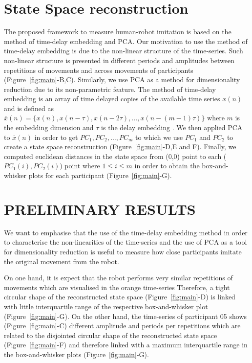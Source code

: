 \documentclass{sig-alternate-05-2015}
\begin{document}
\section{State Space reconstruction}
The proposed framework to measure human-robot imitation
is based on the method of time-delay embedding and PCA.
Our motivation to use the method of time-delay embedding
is due to the non-linear structure of the time-series.
Such non-linear structure is presented in different periods and amplitudes 
between repetitions of movements and across movements of participants (Figure~\ref{fig:main}-B,C).
Similarly, we use PCA as a method for dimensionality reduction due to its non-parametric feature.
The method of time-delay embedding is an array of 
time delayed copies of the available time series $x(n)$ and is defined as  
$ \overline{x}(n) = \{  x(n), x(n-\tau), x(n-2\tau), \dots,x(n-(m-1)\tau)\}$
where $m$ is the embedding dimension and $\tau$ is the delay embedding \cite{Huke2006}.
We then applied PCA to $ \overline{x}(n)$ in order to get $PC_1, PC_2, \dots, PC_m$ 
to which we use $PC_1$ and $PC_2$ 
to create a state space reconstruction (Figure~\ref{fig:main}-D,E and F).
Finally, we computed euclidean distances in the state space 
from (0,0) point to each ($PC_1(i),PC_2(i)$) point where $1 \leq i \leq m$
in order to obtain the box-and-whisker plots for each participant (Figure~\ref{fig:main}-G).




\section{PRELIMINARY RESULTS}



We want to emphasise that the use of the time-delay embedding 
method in order to characterise the non-linearities of the time-series 
and the use of PCA as a tool for dimensionality 
reduction is useful to measure how close participants 
imitate the original movement from the robot.


On one hand, it is expect that the robot performs very similar repetitions of movements 
which are visualised in the orange time-series
Therefore, a tight circular  shape of the reconstructed state space (Figure~\ref{fig:main}-D)
is linked with little interquartile range of the respective box-and-whisker plot  (Figure~\ref{fig:main}-G).
On the other hand, 
the time-series of participant 05 shows (Figure~\ref{fig:main}-C)
 different amplitude and periods per repetitions which
are related to the disjointed circular shape of 
the reconstructed state space (Figure~\ref{fig:main}-F) and therefore 
linked with a maximum interquartile range in the  box-and-whisker plots  (Figure~\ref{fig:main}-G).
\end{document}
